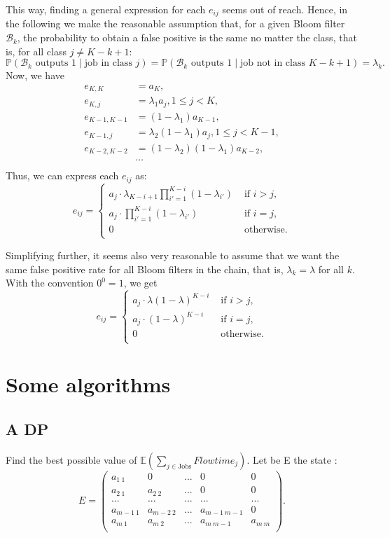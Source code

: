 \documentclass{article}
\begin{document}
This way, finding a general expression for each \(e_{ij}\) seems out of reach.
Hence, in the following we make the reasonable assumption that, for a given Bloom filter \(\mathcal{B}_k\), the probability to obtain a false positive is the same no matter the class, that is, for all class \(j\ne K-k+1\):
\[
    \mathbb{P}(\mathcal{B}_k\text{ outputs 1}\mid\text{job in class }j)=
    \mathbb{P}(\mathcal{B}_k\text{ outputs 1}\mid\text{job not in class }K-k+1)=
    \lambda_k.
\]
Now, we have
\begin{align*}
    e_{K,K}&=a_K, \\
    e_{K,j}&=\lambda_1a_j,1\le j<K, \\
    e_{K-1,K-1}&=(1-\lambda_1)a_{K-1}, \\
    e_{K-1,j}&=\lambda_2(1-\lambda_1)a_j,1\le j<K-1, \\
    e_{K-2,K-2}&=(1-\lambda_2)(1-\lambda_1)a_{K-2}, \\
    &\cdots \\
\end{align*}
Thus, we can express each \(e_{ij}\) as:
\[
    e_{ij}=\begin{cases}
        a_j\cdot\lambda_{K-i+1}\prod_{i'=1}^{K-i} (1-\lambda_{i'}) & \text{ if }i>j, \\
        a_j\cdot\prod_{i'=1}^{K-i} (1-\lambda_{i'}) & \text{ if }i=j, \\
        0 & \text{ otherwise.} \\
    \end{cases}
\]

Simplifying further, it seems also very reasonable to assume that we want the same false positive rate for all Bloom filters in the chain, that is, \(\lambda_k=\lambda\) for all \(k\).
With the convention \(0^0=1\), we get
\[
    e_{ij}=\begin{cases}
        a_j\cdot\lambda(1-\lambda)^{K-i} & \text{ if }i>j, \\
        a_j\cdot(1-\lambda)^{K-i} & \text{ if }i=j, \\
        0 & \text{ otherwise.} \\
    \end{cases}
\]

\newpage
\section{Some algorithms}
\subsection{A DP}
Find the best possible value of $\mathbb{E}(\sum_{j\in\text{Jobs}}Flowtime_j)$. Let be E the state : \[
        E=\begin{pmatrix}
            a_{1\ 1} & 0 & ...& 0 & 0\\
            a_{2\ 1} & a_{2\ 2} & ...& 0 & 0 \\
            ... & ... & ... & ... & ...\\
			a_{m-1\ 1} & a_{m-2\ 2} & ...& a_{m-1\ m-1} & 0 \\	
			a_{m\ 1} & a_{m\ 2} & ... & a_{m\ m-1}& a_{m\ m} \\
        \end{pmatrix}.
    \]
\end{document}
